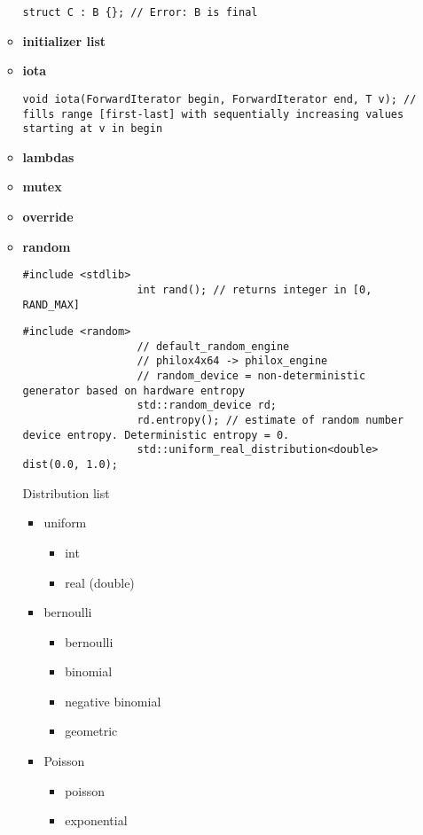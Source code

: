 \documentclass{article}
\begin{document}
\begin{itemize}
\begin{itemize}
\begin{lstlisting}[style=cpp]
struct C : B {}; // Error: B is final
			      \end{lstlisting}
		      \item \textbf{initializer list}
		      \item \textbf{iota}
			      \begin{lstlisting}[style=cpp]
void iota(ForwardIterator begin, ForwardIterator end, T v); // fills range [first-last] with sequentially increasing values starting at v in begin
			      \end{lstlisting}
		      \item \textbf{lambdas}
		      \item \textbf{mutex}
		      \item \textbf{override}
		      \item \textbf{random}
			      \begin{lstlisting}[style=cpp]
			      #include <stdlib>
			      int rand(); // returns integer in [0, RAND_MAX]
			      \end{lstlisting}
			      \begin{lstlisting}[style=cpp]
			      #include <random>
			      // default_random_engine
			      // philox4x64 -> philox_engine
			      // random_device = non-deterministic generator based on hardware entropy
			      std::random_device rd;
			      rd.entropy(); // estimate of random number device entropy. Deterministic entropy = 0.
			      std::uniform_real_distribution<double> dist(0.0, 1.0);
			      \end{lstlisting}
			      Distribution list
			      \begin{itemize}
			      	\item uniform
					\begin{itemize}
						\item int
						\item real (double)
					\end{itemize}
			      	\item bernoulli
					\begin{itemize}
						\item bernoulli
						\item binomial
						\item negative binomial
						\item geometric
					\end{itemize}
			      	\item Poisson
					\begin{itemize}
						\item poisson
						\item exponential

\end{itemize}
\end{itemize}
\end{itemize}
\end{itemize}
\end{document}
